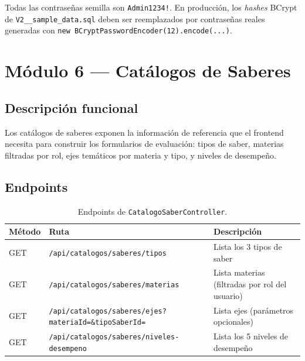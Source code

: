 \documentclass[11pt,a4paper,oneside]{article}
\newcommand{\code}[1]{\texttt{\small #1}}
\begin{document}
\begin{ataraInfo}
Todas las contraseñas semilla son \code{Admin1234!}. En producción, los \emph{hashes} BCrypt
de \code{V2\_\_sample\_data.sql} deben ser reemplazados por contraseñas reales generadas con
\code{new BCryptPasswordEncoder(12).encode(...)}.
\end{ataraInfo}

\section{Módulo 6 — Catálogos de Saberes}

\subsection{Descripción funcional}

Los catálogos de saberes exponen la información de referencia que el frontend necesita para
construir los formularios de evaluación: tipos de saber, materias filtradas por rol, ejes
temáticos por materia y tipo, y niveles de desempeño.

\subsection{Endpoints}

\begin{table}[h]
\centering\renewcommand{\arraystretch}{1.2}\small
\begin{tabular}{@{}p{1.4cm} p{6.5cm} p{6.0cm}@{}}
\toprule
\textbf{Método} & \textbf{Ruta} & \textbf{Descripción} \\
\midrule
GET & \code{/api/catalogos/saberes/tipos}                       & Lista los 3 tipos de saber \\
GET & \code{/api/catalogos/saberes/materias}                    & Lista materias (filtradas por rol del usuario) \\
GET & \code{/api/catalogos/saberes/ejes?materiaId=\&tipoSaberId=} & Lista ejes (parámetros opcionales) \\
GET & \code{/api/catalogos/saberes/niveles-desempeno}           & Lista los 5 niveles de desempeño \\
\bottomrule
\end{tabular}
\caption{Endpoints de \code{CatalogoSaberController}.}
\end{table}
\end{document}
